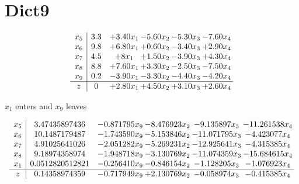 \documentclass[12pt]{article}
\begin{document}
\section{Dict9}
{\tiny

\[\begin{array}{c| c c@{\hskip 2pt} c@{\hskip 2pt} c@{\hskip 2pt} c@{\hskip 2pt} }
 x_5   &  3.3 & + 3.4  0 x_1 & -5.6  0 x_2 & -5.3  0 x_3 & -7.6  0 x_4\\
 x_6   &  9.8 & + 6.8  0 x_1 & + 0.6  0 x_2 & -3.4  0 x_3 & + 2.9  0 x_4\\
 x_7   &  4.5 & + 8 x_1 & + 1.5  0 x_2 & -3.9  0 x_3 & + 4.3  0 x_4\\
 x_8   &  8.8 & + 7.6  0 x_1 & + 3.3  0 x_2 & -2.5  0 x_3 & -7.5  0 x_4\\
 x_9   &  0.2 & -3.9  0 x_1 & -3.3  0 x_2 & -4.4  0 x_3 & -4.2  0 x_4\\
\hline
z    &  0 & + 2.8  0 x_1 & + 4.5  0 x_2 & + 3.1  0 x_3 & + 2.6  0 x_4\\
\end{array}\]


 $ x_1 $ enters and $ x_9 $ leaves 

 \[\begin{array}{c| c c@{\hskip 2pt} c@{\hskip 2pt} c@{\hskip 2pt} c@{\hskip 2pt} }
 x_5   &  3.47435897436 & -0.871795 x_9 & -8.476923 x_2 & -9.135897 x_3 & -11.261538 x_4\\
 x_6   &  10.1487179487 & -1.743590 x_9 & -5.153846 x_2 & -11.071795 x_3 & -4.423077 x_4\\
 x_7   &  4.91025641026 & -2.051282 x_9 & -5.269231 x_2 & -12.925641 x_3 & -4.315385 x_4\\
 x_8   &  9.18974358974 & -1.948718 x_9 & -3.130769 x_2 & -11.074359 x_3 & -15.684615 x_4\\
 x_1   &  0.0512820512821 & -0.256410 x_9 & -0.846154 x_2 & -1.128205 x_3 & -1.076923 x_4\\
\hline
z    &  0.14358974359 & -0.717949 x_9 & + 2.130769 x_2 & -0.058974 x_3 & -0.415385 x_4\\
\end{array}\]

}
\end{document}
